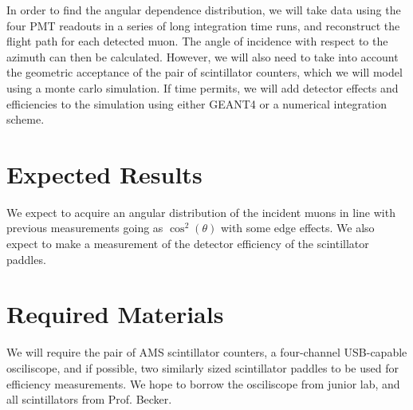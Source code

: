 In order to find the angular dependence distribution, we will take data using the four PMT readouts in a series of long integration time runs, and reconstruct the flight path for each detected muon. The angle of incidence with respect to the azimuth can then be calculated. However, we will also need to take into account the geometric acceptance of the pair of scintillator counters, which we will model using a monte carlo simulation. If time permits, we will add detector effects and efficiencies to the simulation using either GEANT4 or a numerical integration scheme.

\section{Expected Results}

We expect to acquire an angular distribution of the incident muons in line with previous measurements going as $\cos^2(\theta)$ with some edge effects. We also expect to make a measurement of the detector efficiency of the scintillator paddles. 

\section{Required Materials}

We will require the pair of AMS scintillator counters, a four-channel USB-capable osciliscope, and if possible, two similarly sized scintillator paddles to be used for efficiency measurements. We hope to borrow the osciliscope from junior lab, and all scintillators from Prof. Becker.






